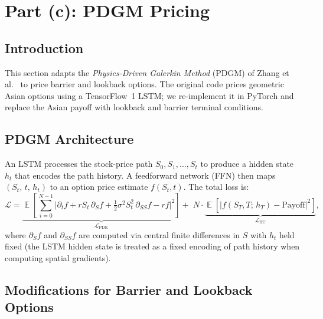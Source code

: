 \documentclass[12pt,a4paper]{article}
\DeclareMathOperator{\E}{\mathbb{E}}
\begin{document}
\clearpage
\section{Part (c): PDGM Pricing}
\label{sec:partc}

\subsection{Introduction}

This section adapts the \emph{Physics-Driven Galerkin Method} (PDGM) of
Zhang et al.~\cite{pdgm2022} to price barrier and lookback options.
The original code prices geometric Asian options using a TensorFlow~1 LSTM;
we re-implement it in PyTorch and replace the Asian payoff with lookback and
barrier terminal conditions.

\subsection{PDGM Architecture}

An LSTM processes the stock-price path $S_0, S_1, \ldots, S_t$ to produce
a hidden state $h_t$ that encodes the path history.  A feedforward network
(FFN) then maps $(S_t,\, t,\, h_t)$ to an option price estimate $f(S_t, t)$.
The total loss is:
\begin{equation}
  \mathcal{L} = \underbrace{\E\!\left[\sum_{i=0}^{N-1}
    \bigl|\partial_t f + r S_t\,\partial_S f
    + \tfrac{1}{2}\sigma^2 S_t^2\,\partial_{SS}f - rf\bigr|^2
  \right]}_{\mathcal{L}_{\mathrm{PDE}}}
  +\; N\cdot\underbrace{\E\!\left[
    \bigl|f(S_T, T;\, h_T) - \text{Payoff}\bigr|^2
  \right]}_{\mathcal{L}_{\mathrm{TC}}},
  \label{eq:pdgm_loss}
\end{equation}
where $\partial_S f$ and $\partial_{SS}f$ are computed via central finite
differences in $S$ with $h_t$ held fixed (the LSTM hidden state is treated
as a fixed encoding of path history when computing spatial gradients).

\subsection{Modifications for Barrier and Lookback Options}
\end{document}
